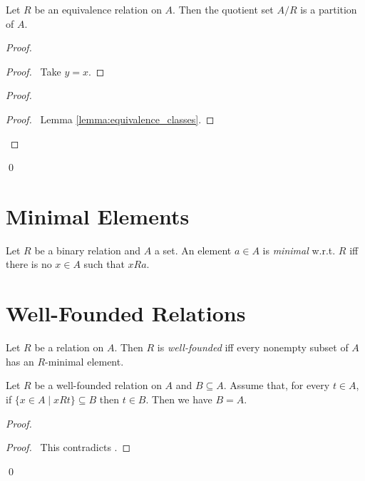 \begin{theorem}
    Let $R$ be an equivalence relation on $A$. Then the quotient set $A / R$
    is a partition of $A$.
\end{theorem}

\begin{proof}
    \pf
    \begin{proof}
        \pf\ Take $y = x$.
    \end{proof}
    \begin{proof}
        \begin{proof}
            \pf\ Lemma \ref{lemma:equivalence_classes}.
        \end{proof}
    \end{proof}
    \qed
\end{proof}

\section{Minimal Elements}

\begin{definition}[Minimal]
    Let $R$ be a binary relation and $A$ a set. An element $a \in A$
    is \emph{minimal} w.r.t. $R$ iff there is no $x \in A$
    such that $xRa$.
\end{definition}

\section{Well-Founded Relations}

\begin{definition}
    Let $R$ be a relation on $A$. Then $R$ is \emph{well-founded}
    iff every nonempty subset of $A$ has an $R$-minimal element.
\end{definition}

\begin{theorem}
    Let $R$ be a well-founded relation on $A$ and $B \subseteq A$.
    Assume that, for every $t \in A$, if $\{ x \in A \mid x Rt \} \subseteq B$
    then $t \in B$. Then we have $B = A$.
\end{theorem}

\begin{proof}
    \pf
    \qedstep
    \begin{proof}
        \pf\ This contradicts .
    \end{proof}
    \qed
\end{proof}


